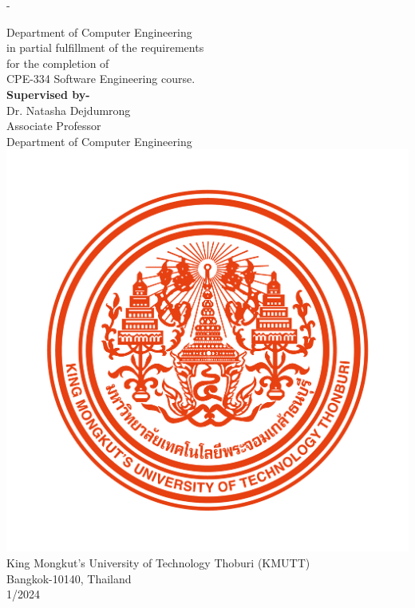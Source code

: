 \begin{titlingpage}
\begin{SingleSpace}
\begin{adjustwidth*}{\unitlength}{-\unitlength}
\begin{center}
				{\large {Department of Computer Engineering}}\\
				{\large {in partial fulfillment of the requirements \\ for the completion of\\ CPE-334 Software Engineering course.}}\\
				\vspace{12mm}
				{\large \textbf{Supervised by-} }\\
				\vspace{3mm}
				{\large{Dr. Natasha Dejdumrong}}\\
				{\large {Associate Professor}}\\

				{\large {Department of Computer Engineering}}\\
				\vspace{12mm}
				\includegraphics[scale=0.25]{frontmatter/KMUTT_CI.png} \\[0.25cm]
				\vspace{12mm}
				{\large King Mongkut's University of Technology Thoburi (KMUTT)}\\
				{\large Bangkok-10140, Thailand}\\
				{\large 1/2024}\\
			\end{center}
		\end{adjustwidth*}
	\end{SingleSpace}
\end{titlingpage}
